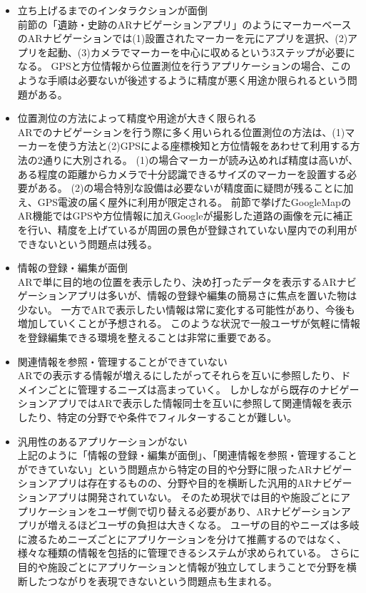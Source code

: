 \begin{itemize}
  \item 立ち上げるまでのインタラクションが面倒\\
    前節の「遺跡・史跡のARナビゲーションアプリ」のようにマーカーベースのARナビゲーションでは(1)設置されたマーカーを元にアプリを選択、(2)アプリを起動、(3)カメラでマーカーを中心に収めるという3ステップが必要になる。
    GPSと方位情報から位置測位を行うアプリケーションの場合、このような手順は必要ないが後述するように精度が悪く用途か限られるという問題がある。
  \item 位置測位の方法によって精度や用途が大きく限られる\\
    ARでのナビゲーションを行う際に多く用いられる位置測位の方法は、(1)マーカーを使う方法と(2)GPSによる座標検知と方位情報をあわせて利用する方法の2通りに大別される。
    (1)の場合マーカーが読み込めれば精度は高いが、ある程度の距離からカメラで十分認識できるサイズのマーカーを設置する必要がある。
    (2)の場合特別な設備は必要ないが精度面に疑問が残ることに加え、GPS電波の届く屋外に利用が限定される。
    前節で挙げたGoogleMapのAR機能ではGPSや方位情報に加えGoogleが撮影した道路の画像を元に補正を行い、精度を上げているが周囲の景色が登録されていない屋内での利用ができないという問題点は残る。
  \item 情報の登録・編集が面倒\\
    ARで単に目的地の位置を表示したり、決め打ったデータを表示するARナビゲーションアプリは多いが、情報の登録や編集の簡易さに焦点を置いた物は少ない。
    一方でARで表示したい情報は常に変化する可能性があり、今後も増加していくことが予想される。
    このような状況で一般ユーザが気軽に情報を登録編集できる環境を整えることは非常に重要である。
  \item 関連情報を参照・管理することができていない\\
    ARでの表示する情報が増えるにしたがってそれらを互いに参照したり、ドメインごとに管理するニーズは高まっていく。
    しかしながら既存のナビゲーションアプリではARで表示した情報同士を互いに参照して関連情報を表示したり、特定の分野でや条件でフィルターすることが難しい。
  \item 汎用性のあるアプリケーションがない\\
    上記のように「情報の登録・編集が面倒」、「関連情報を参照・管理することができていない」という問題点から特定の目的や分野に限ったARナビゲーションアプリは存在するものの、分野や目的を横断した汎用的ARナビゲーションアプリは開発されていない。
    そのため現状では目的や施設ごとにアプリケーションをユーザ側で切り替える必要があり、ARナビゲーションアプリが増えるほどユーザの負担は大きくなる。
    ユーザの目的やニーズは多岐に渡るためニーズごとにアプリケーションを分けて推薦するのではなく、様々な種類の情報を包括的に管理できるシステムが求められている。
    さらに目的や施設ごとにアプリケーションと情報が独立してしまうことで分野を横断したつながりを表現できないという問題点も生まれる。
\end{itemize}



